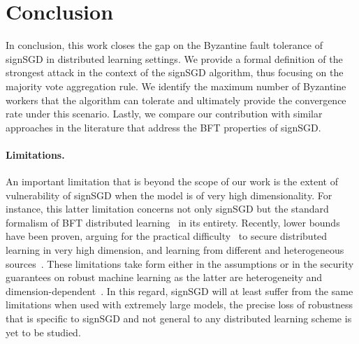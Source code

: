 \section{Conclusion}
\label{sec:conclusion}
In conclusion, this work closes the gap on the Byzantine fault tolerance of signSGD in distributed learning settings. We provide a formal definition of the strongest attack in the context of the signSGD algorithm, thus focusing on the majority vote aggregation rule. We identify the maximum number of Byzantine workers that the algorithm can tolerate and ultimately provide the convergence rate under this scenario. Lastly, we compare our contribution with similar approaches in the literature that address the BFT properties of signSGD.

\paragraph{Limitations.} An important limitation that is beyond the scope of our work is the extent of vulnerability of signSGD when the model is of very high dimensionality. For instance, this latter limitation concerns not only signSGD but the standard formalism of BFT distributed learning~\cite{blanchard2017machine} in its entirety. Recently, lower bounds~\cite{jungle} have been proven, arguing for the practical difficulty~\cite{mhamdi2018hidden, baruch2019little} to secure distributed learning in very high dimension, and learning from different and heterogeneous sources~\cite{karimireddy2021byzantine}. These limitations take form either in the assumptions or in the security guarantees on robust machine learning as the latter are heterogeneity and dimension-dependent~\cite{el2022impossible}.
In this regard, signSGD will at least suffer from the same limitations when used with extremely large models, the precise loss of robustness that is specific to signSGD and not general to any distributed learning scheme is yet to be studied.
